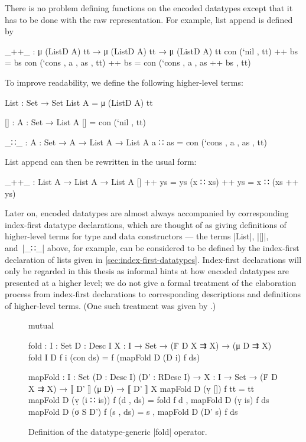 
There is no problem defining functions on the encoded datatypes except that it has to be done with the raw representation.
For example, list append is defined by
\begin{code}
_++_ : μ (ListD A) tt → μ (ListD A) tt → μ (ListD A) tt
con (`nil   ,           tt) ++ bs = bs
con (`cons  , a , as ,  tt) ++ bs = con (`cons , a , as ++ bs , tt)
\end{code}
To improve readability, we define the following higher-level terms:
\begin{code}
List : Set → Set
List A = μ (ListD A) tt

[] : {A : Set} → List A
[] = con (`nil , tt)

_∷_ : {A : Set} → A → List A → List A
a ∷ as = con (`cons  , a , as ,  tt)
\end{code}
List append can then be rewritten in the usual form:
\begin{code}
_++_ : List A → List A → List A
[]        ++ ys = ys
(x ∷ xs)  ++ ys = x ∷ (xs ++ ys)
\end{code}
Later on, encoded datatypes are almost always accompanied by corresponding index-first datatype declarations, which are thought of as giving definitions of higher-level terms for type and data constructors --- the terms |List|, |[]|, and~|_∷_| above, for example, can be considered to be defined by the index-first declaration of lists given in \autoref{sec:index-first-datatypes}.
Index-first declarations will only be regarded in this thesis as informal hints at how encoded datatypes are presented at a higher level; we do not give a formal treatment of the elaboration process from index-first declarations to corresponding descriptions and definitions of higher-level terms.
(One such treatment was given by \citet{Dagand-elaboration}.)

\begin{figure}
\codefigure
\begin{code}
mutual

  fold : {I : Set} {D : Desc I} {X : I → Set} → (Ḟ D X ⇉ X) → (μ D ⇉ X)
  fold {I} {D} f {i} (con ds) = f (mapFold D (D i) f ds)

  mapFold :  {I : Set} (D : Desc I) (D' : RDesc I) →
             {X : I → Set} → (Ḟ D X ⇉ X) → ⟦ D' ⟧ (μ D) → ⟦ D' ⟧ X
  mapFold D (ṿ [])        f tt         = tt
  mapFold D (ṿ (i ∷ is))  f (d  , ds)  = fold f d , mapFold D (ṿ is) f ds
  mapFold D (σ S D')      f (s  , ds)  = s , mapFold D (D' s) f ds
\end{code}
\caption{Definition of the datatype-generic |fold| operator.}
\label{fig:fold}
\end{figure}

